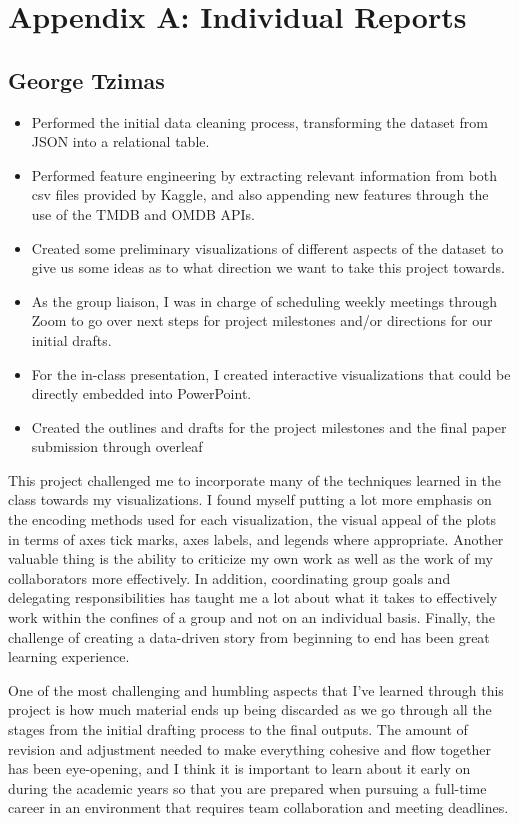 \documentclass[12pt]{article}
\begin{document}



\appendix
\section[A]{Appendix A: Individual Reports}

\subsection{George Tzimas}
\begin{itemize}
  \item Performed the initial data cleaning process, transforming the dataset from JSON into a relational table.
  \item Performed feature engineering by extracting relevant information from both csv files provided by Kaggle, and also appending new features through the use of the TMDB and OMDB APIs.
  \item Created some preliminary visualizations of different aspects of the dataset to give us some ideas as to what direction we want to take this project towards.
  \item As the group liaison, I was in charge of scheduling weekly meetings through Zoom to go over next steps for project milestones and/or directions for our initial drafts.
  \item For the in-class presentation, I created interactive visualizations that could be directly embedded into PowerPoint.
  \item Created the outlines and drafts for the project milestones and the final paper submission through overleaf
\end{itemize}

This project challenged me to incorporate many of the techniques learned in the class towards my visualizations. I found myself putting a lot more emphasis on the encoding methods used for each visualization, the visual appeal of the plots in terms of axes tick marks, axes labels, and legends where appropriate. Another valuable thing is the ability to criticize my own work as well as the work of my collaborators more effectively. In addition, coordinating group goals and delegating responsibilities has taught me a lot about what it takes to effectively work within the confines of a group and not on an individual basis. Finally, the challenge of creating a data-driven story from beginning to end has been great learning experience. 

One of the most challenging and humbling aspects that I've learned through this project is how much material ends up being discarded as we go through all the stages from the initial drafting process to the final outputs. The amount of revision and adjustment needed to make everything cohesive and flow together has been eye-opening, and I think it is important to learn about it early on during the academic years so that you are prepared when pursuing a full-time career in an environment that requires team collaboration and meeting deadlines.
\end{document}
